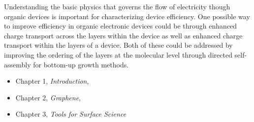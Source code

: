 Understanding the basic physics that governs the flow of electricity though organic devices is important for characterizing device efficiency. One possible way to improve efficiency in organic electronic devices could be through enhanced charge transport across the layers within the device as well as enhanced charge transport within the layers of a device. Both of these could be addressed by improving the ordering of the layers at the molecular level through directed self-assembly for bottom-up growth methods. 

\begin{itemize}
\item Chapter 1, \emph{Introduction}, 
\item Chapter 2, \emph{Graphene},
\item Chapter 3, \emph{Tools for Surface Science}
\end{itemize}

